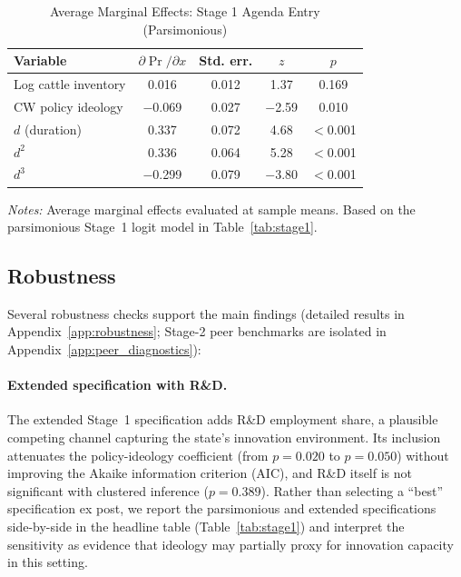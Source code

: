 \documentclass[12pt]{article}
\begin{document}
\begin{table}[htbp]
\centering
\begin{threeparttable}
\caption{Average Marginal Effects: Stage 1 Agenda Entry (Parsimonious)}
\label{tab:ame}
\begin{tabular}{lcccc}
\toprule
Variable & $\partial\Pr/\partial x$ & Std. err. & $z$ & $p$ \\
\midrule
Log cattle inventory   & 0.016 & 0.012 & 1.37 & 0.169 \\
CW policy ideology     & $-$0.069 & 0.027 & $-$2.59 & 0.010 \\
$d$  (duration)        & 0.337 & 0.072 & 4.68 & $<$0.001 \\
$d^2$                  & 0.336 & 0.064 & 5.28 & $<$0.001 \\
$d^3$                  & $-$0.299 & 0.079 & $-$3.80 & $<$0.001 \\
\bottomrule
\end{tabular}
\begin{tablenotes}[flushleft]
\footnotesize
\item \textit{Notes:} Average marginal effects evaluated at sample means.  Based on the parsimonious Stage~1 logit model in Table~\ref{tab:stage1}.
\end{tablenotes}
\end{threeparttable}
\end{table}


\subsection{Robustness}
\label{sec:robustness}

Several robustness checks support the main findings (detailed results in Appendix~\ref{app:robustness}; Stage-2 peer benchmarks are isolated in Appendix~\ref{app:peer_diagnostics}):

\paragraph{Extended specification with R\&D.}  The extended Stage~1 specification adds R\&D employment share, a plausible competing channel capturing the state's innovation environment.  Its inclusion attenuates the policy-ideology coefficient (from $p = 0.020$ to $p = 0.050$) without improving the Akaike information criterion (AIC), and R\&D itself is not significant with clustered inference ($p = 0.389$).  Rather than selecting a ``best'' specification ex post, we report the parsimonious and extended specifications side-by-side in the headline table (Table~\ref{tab:stage1}) and interpret the sensitivity as evidence that ideology may partially proxy for innovation capacity in this setting.
\end{document}
